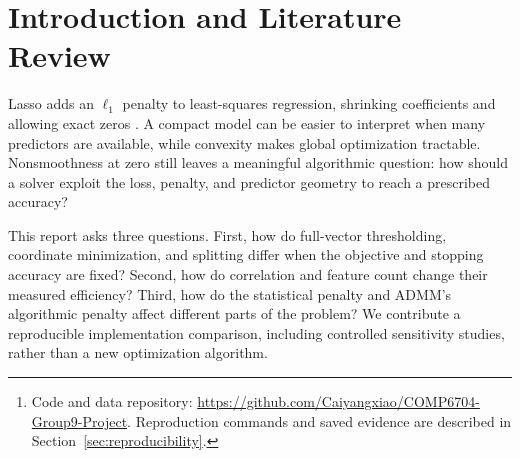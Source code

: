 \documentclass[10pt,letterpaper]{article}
\newcommand{\projectrepository}{\url{https://github.com/Caiyangxiao/COMP6704-Group9-Project}}
\begin{document}
\begin{abstract}
Lasso regression combines squared loss with an $\ell_1$ penalty to learn sparse linear models. We review its convex formulation and implement ISTA, standard FISTA, cyclic coordinate descent, and scaled ADMM. All four solve the same training problems and stop at a common proximal-gradient residual, with ADMM's factorization included in runtime. A fresh comparison uses three synthetic instances, one fixed Diabetes split, paired correlation and dimension studies, and ADMM penalty sensitivity. All 560 primary timing runs converge, with nearly identical final objectives and predictions. ISTA has the lowest mean time on independent-feature designs; ADMM is fastest on the recorded Diabetes split and has the lowest mean at the three positive correlation levels. Strongly correlated FISTA runs vary substantially. ADMM's setup cost grows with feature count, and its algorithmic penalty changes convergence speed without changing the Lasso estimator. Coefficient and regularization analyses distinguish numerical accuracy, sparse selection, and shrinkage error. Conclusions remain specific to the recorded implementations, datasets, and stopping rule.\footnote{Code and data repository: \projectrepository. Reproduction commands and saved evidence are described in Section~\ref{sec:reproducibility}.}
\end{abstract}

\section{Introduction and Literature Review}
Lasso adds an $\ell_1$ penalty to least-squares regression, shrinking coefficients and allowing exact zeros \citep{tibshirani1996}. A compact model can be easier to interpret when many predictors are available, while convexity makes global optimization tractable. Nonsmoothness at zero still leaves a meaningful algorithmic question: how should a solver exploit the loss, penalty, and predictor geometry to reach a prescribed accuracy?

This report asks three questions. First, how do full-vector thresholding, coordinate minimization, and splitting differ when the objective and stopping accuracy are fixed? Second, how do correlation and feature count change their measured efficiency? Third, how do the statistical penalty and ADMM's algorithmic penalty affect different parts of the problem? We contribute a reproducible implementation comparison, including controlled sensitivity studies, rather than a new optimization algorithm.
\end{document}
